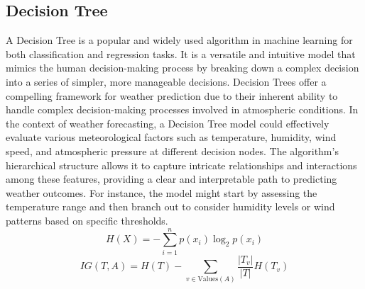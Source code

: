 \documentclass[conference, onecolumn]{IEEEtran}
\begin{document}
\subsection{\textbf{Decision Tree}}
A Decision Tree is a popular and widely used algorithm in machine learning for both classification and regression tasks. It is a versatile and intuitive model that mimics the human decision-making process by breaking down a complex decision into a series of simpler, more manageable decisions. Decision Trees offer a compelling framework for weather prediction due to their inherent ability to handle complex decision-making processes involved in atmospheric conditions. In the context of weather forecasting, a Decision Tree model could effectively evaluate various meteorological factors such as temperature, humidity, wind speed, and atmospheric pressure at different decision nodes. The algorithm's hierarchical structure allows it to capture intricate relationships and interactions among these features, providing a clear and interpretable path to predicting weather outcomes. For instance, the model might start by assessing the temperature range and then branch out to consider humidity levels or wind patterns based on specific thresholds.
\\  \[ H(X) = - \sum_{i=1}^{n} p(x_i) \log_2 p(x_i) \]
\[ IG(T, A) = H(T) - \sum_{v \in \text{Values}(A)} \frac{|T_v|}{|T|} H(T_v) \]
\end{document}
